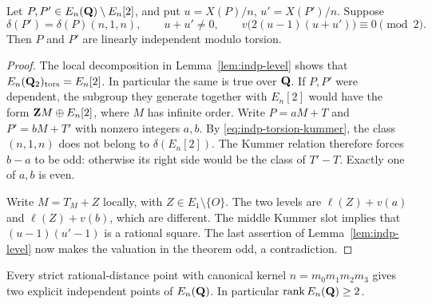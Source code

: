 \begin{theorem}
\label{thm:indp-criterion}
Let $P,P'\in E_n(\mathbf Q)\setminus E_n[2]$, and put
$u=X(P)/n$, $u'=X(P')/n$.  Suppose
\[
 \delta(P')=\delta(P)(n,1,n),\qquad u+u'\ne0,
 \qquad v\bigl(2(u-1)(u+u')\bigr)\equiv0\pmod2.
\]
Then $P$ and $P'$ are linearly independent modulo torsion.
\end{theorem}

\begin{proof}
The local decomposition in Lemma~\ref{lem:indp-level} shows that
$E_n(\mathbf Q_2)_{\rm tors}=E_n[2]$.  In particular the same is true
over $\mathbf Q$.  If $P,P'$ were dependent, the subgroup they generate
together with $E_n[2]$ would have the form
$\mathbf Z M\oplus E_n[2]$, where $M$ has infinite order.  Write
$P=aM+T$ and $P'=bM+T'$ with nonzero integers $a,b$.
By \eqref{eq:indp-torsion-kummer}, the class $(n,1,n)$ does not
belong to $\delta(E_n[2])$.  The Kummer relation therefore forces
$b-a$ to be odd: otherwise its right side would be the class of
$T'-T$.  Exactly one of $a,b$ is even.

Write $M=T_M+Z$ locally, with $Z\in E_1\setminus\{O\}$.
The two levels are $\ell(Z)+v(a)$ and $\ell(Z)+v(b)$, which
are different.  The middle Kummer slot implies that
$(u-1)(u'-1)$ is a rational square.  The last assertion of
Lemma~\ref{lem:indp-level} now makes the valuation in the theorem
odd, a contradiction.
\end{proof}

\begin{corollary}
\label{cor:indp-original}
Every strict rational-distance point with canonical kernel
$n=m_0m_1m_2m_3$ gives two explicit independent points of
$E_n(\mathbf Q)$.  In particular $\operatorname{rank} E_n(\mathbf Q)\geq2$.
\end{corollary}

